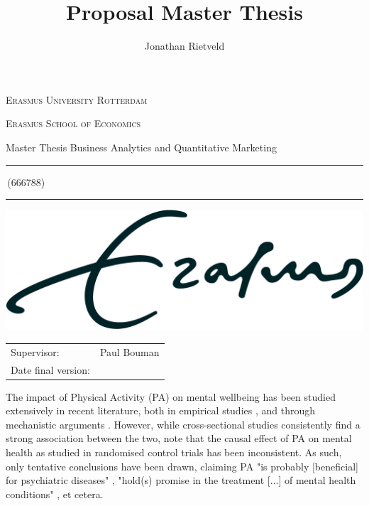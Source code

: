 \documentclass[a4paper,11pt]{report}
\author{Jonathan Rietveld}
\title{Proposal Master Thesis}
\newcommand{\studentnumber}{666788}
\newcommand{\program}{Business Analytics and Quantitative Marketing}
\newcommand{\supervisor}{Paul Bouman}
\begin{document}
\begin{titlepage}
\makeatletter
\begin{center}
	\textsc{Erasmus University Rotterdam}
	\par \textsc{Erasmus School of Economics}
	\par Master Thesis \program

	\vfill \hrule height .08em \bigskip
	\par\huge\@title\bigskip
	\par\Large\@author\,(\studentnumber)\bigskip
	\hrule height .08em\normalsize

	\vfill
	\includegraphics[width=\textwidth,height=0.15\textheight,keepaspectratio]{../eur}
	\vfill

	\begin{tabular}{ll}
		\toprule
		Supervisor: & \supervisor\\
		Date final version: & \@date\\
		\bottomrule
	\end{tabular}

	\vfill
\end{center}
\makeatother
\end{titlepage}

The impact of Physical Activity (PA) on mental wellbeing has been studied extensively in recent literature,
both in empirical studies \cite{noetel2024effect, mahindru2023role}, and through mechanistic arguments \cite{smith2021role}.
However, while cross-sectional studies consistently find a strong association between the two, 
note that the causal effect of PA on mental health as studied in randomised control trials has been inconsistent.
As such, only tentative conclusions have been drawn, claiming PA "is probably [beneficial] for psychiatric diseases"
\cite{peluso2005physical}, "hold(s) promise in the treatment [...] of mental health conditions" \cite{smith2021role}, et cetera.
\end{document}
